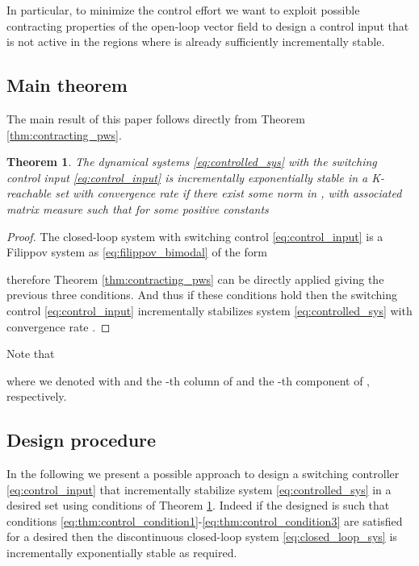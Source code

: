 \documentclass[letterpaper, 10 pt, conference]{ieeeconf}
\newtheorem{theorem}{Theorem}
\begin{document}
In particular, to minimize the control effort we want to exploit possible contracting properties of the open-loop vector field  to design a control input that is not active in the regions where  is already sufficiently incrementally stable.

\subsection{Main theorem}
The main result of this paper follows directly from Theorem \ref{thm:contracting_pws}.
\begin{theorem}
\label{thm:main_control}
The dynamical systems \eqref{eq:controlled_sys} with the switching control input \eqref{eq:control_input} is incrementally exponentially stable in a K-reachable set  with convergence rate  if there exist some norm in , with associated matrix measure  such that for some positive constants 

\end{theorem}
\vspace{0.3cm}
\begin{proof}
The closed-loop system with switching control \eqref{eq:control_input} is a Filippov system as \eqref{eq:filippov_bimodal} of the form

therefore Theorem \ref{thm:contracting_pws} can be directly applied giving the previous three conditions. And thus if these conditions hold then the switching control \eqref{eq:control_input} incrementally stabilizes system \eqref{eq:controlled_sys} with convergence rate .
\end{proof}

Note that

where we denoted with  and  the -th column of  and the -th component of , respectively.

\subsection{Design procedure}

In the following we present a possible approach to design a switching controller \eqref{eq:control_input} that incrementally stabilize system \eqref{eq:controlled_sys} in a desired set using conditions of Theorem \ref{thm:main_control}. Indeed if the designed  is such that conditions \eqref{eq:thm:control_condition1}-\eqref{eq:thm:control_condition3} are satisfied for a desired  then the discontinuous closed-loop system \eqref{eq:closed_loop_sys} is incrementally exponentially stable as required.
\end{document}
